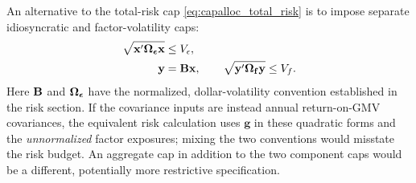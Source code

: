 \documentclass[11pt]{gappyarticle}
\begin{document}
An alternative to the total-risk cap \eqref{eq:capalloc_total_risk}
is to impose separate idiosyncratic and factor-volatility caps:
\begin{align}
    \sqrt{{\mathbf{x}}'{\boldsymbol{\Omega}}_{\boldsymbol{\epsilon}}{\mathbf{x}}}
       &\leq V_{\epsilon},\\
    {\mathbf{y}}&={\mathbf{B}}{\mathbf{x}},\qquad
    \sqrt{{\mathbf{y}}'{\boldsymbol{\Omega}}_{\mathbf{f}}{\mathbf{y}}}\leq V_f .
\end{align}
Here ${\mathbf{B}}$ and ${\boldsymbol{\Omega}}_{\boldsymbol{\epsilon}}$ have the normalized, dollar-volatility
convention established in the risk section. If the covariance inputs are
instead annual return-on-GMV covariances, the equivalent risk calculation uses
$\mathbf g$ in these quadratic forms and the \emph{unnormalized} factor
exposures; mixing the two conventions would misstate the risk budget.
An aggregate cap in addition to the two component caps would be a different,
potentially more restrictive specification.
\end{document}
